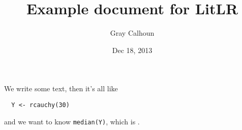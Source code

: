 \documentclass{article}
\title{Example document for LitLR}
\author{Gray Calhoun}
\date{Dec 18, 2013}
\begin{document}
\maketitle
\noindent
We write some text, then it's all like
\begin{lstlisting}
  Y <- rcauchy(30)
\end{lstlisting}
and we want to know \lstinline|median(Y)|, which is .
\end{document}
